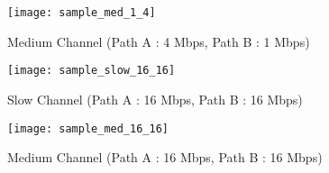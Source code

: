 \begin{figure}[!ht]
\caption{Medium Channel (Path A : 4 Mbps, Path B : 1 Mbps)}
\centering
\texttt{[image: sample\_med\_1\_4]}
\end{figure}

\begin{figure}[!ht]
\caption{Slow Channel (Path A : 16 Mbps, Path B : 16 Mbps)}
\centering
\texttt{[image: sample\_slow\_16\_16]}
\end{figure}

\begin{figure}[!ht]
\caption{Medium Channel (Path A : 16 Mbps, Path B : 16 Mbps)}
\centering
\texttt{[image: sample\_med\_16\_16]}
\end{figure}